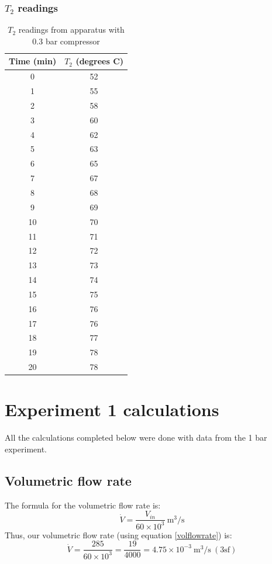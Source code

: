 \documentclass[class=article, crop=false, 12pt,a4paper]{standalone}
\numberwithin{equation}{section}
\begin{document}
\subsubsection{\(T_2\) readings}
\begin{table}
  \centering
    \begin{tabular}{|c|c|}
      \hline
      Time (\si{\minute}) & \(T_2\) (degrees C)\\
      \hline  
      0 & 52\\
      1 & 55\\
      2 & 58\\
      3 & 60\\
      4 & 62\\
      5 & 63\\
      6 & 65\\
      7 & 67\\
      8 & 68\\
      9 & 69\\
      10 & 70\\
      11 & 71\\
      12 & 72\\
      13 & 73\\
      14 & 74\\
      15 & 75\\
      16 & 76\\
      17 & 76\\
      18 & 77\\
      19 & 78\\
      20 & 78\\
      \hline
    \end{tabular}
  \caption{\(T_2\) readings from apparatus with 0.3 bar compressor}
  \label{table:3}
\end{table}
\section{Experiment 1 calculations}
All the calculations completed below were done with data from the 1 bar experiment.
\subsection{Volumetric flow rate}
The formula for the volumetric flow rate is:
\begin{equation}
  \dot{V} = \frac{V_{in}}{60 \times 10^3} \ \si{\meter\cubed\per\second}
  \label{volflowrate}
\end{equation}
Thus, our volumetric flow rate (using equation \ref{volflowrate}) is:
\begin{equation} 
  \dot{V} = \frac{285}{60\times 10^3} = \frac{19}{4000} = 4.75 \times 10^{-3} \ \si{\meter\cubed\per\second} \ (3\textrm{sf})
\end{equation}
\end{document}
